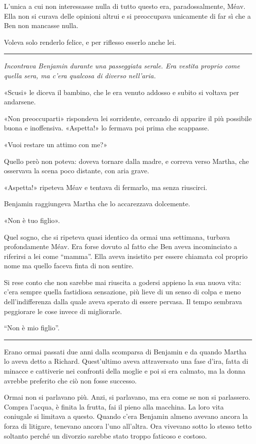 L'unica a cui non interessasse nulla di tutto questo era, paradossalmente, Méav. Ella non si curava
delle opinioni altrui e si preoccupava unicamente di far sì che a Ben non mancasse nulla.

Voleva solo renderlo felice, e per riflesso esserlo anche lei.

\plainbreak{1}

{\itshape Incontrava Benjamin durante una passeggiata serale. Era vestita proprio come quella sera,
ma c'era qualcosa di diverso nell'aria.

«Scusi» le diceva il bambino, che le era venuto addosso e subito si voltava per andarsene.

«Non preoccuparti» rispondeva lei sorridente, cercando di apparire il più possibile buona e
inoffensiva. «Aspetta!» lo fermava poi prima che scappasse.

«Vuoi restare un attimo con me?»

Quello però non poteva: doveva tornare dalla madre, e correva verso Martha, che osservava la scena
poco distante, con aria grave.

«Aspetta!» ripeteva Méav e tentava di fermarlo, ma senza riuscirci.

Benjamin raggiungeva Martha che lo accarezzava dolcemente.

«Non è tuo figlio». \/}

Quel sogno, che si ripeteva quasi identico da ormai una settimana, turbava profondamente Méav. Era
forse dovuto al fatto che Ben aveva incominciato a riferirsi a lei come ``mamma''. Ella aveva
insistito per essere chiamata col proprio nome ma quello faceva finta di non sentire.

Si rese conto che non sarebbe mai riuscita a godersi appieno la sua nuova vita: c'era sempre quella
fastidiosa sensazione, più lieve di un senso di colpa e meno dell'indifferenza dalla quale aveva
sperato di essere pervasa. Il tempo sembrava peggiorare le cose invece di migliorarle.

``Non è mio figlio''.

\plainbreak{1}

Erano ormai passati due anni dalla scomparsa di Benjamin e da quando Martha lo aveva detto a
Richard. Quest'ultimo aveva attraversato una fase d'ira, fatta di minacce e cattiverie nei confronti
della moglie e poi si era calmato, ma la donna avrebbe preferito che ciò non fosse successo.

Ormai non si parlavano più. Anzi, si parlavano, ma era come se non si parlassero. Compra l'acqua, è
finita la frutta, fai il pieno alla macchina. La loro vita coniugale si limitava a questo. Quando
c'era Benjamin almeno avevano ancora la forza di litigare, tenevano ancora l'uno all'altra. Ora
vivevano sotto lo stesso tetto soltanto perché un divorzio sarebbe stato troppo faticoso e costoso.

